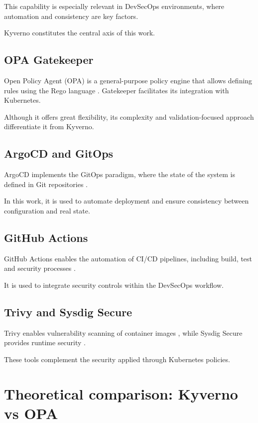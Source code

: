 This capability is especially relevant in DevSecOps environments, where automation and consistency are key factors.

Kyverno constitutes the central axis of this work.

\subsection{OPA Gatekeeper}

Open Policy Agent (OPA) is a general-purpose policy engine that allows defining rules using the Rego language \cite{opa_docs}. Gatekeeper facilitates its integration with Kubernetes.

Although it offers great flexibility, its complexity and validation-focused approach differentiate it from Kyverno.

\subsection{ArgoCD and GitOps}

ArgoCD implements the GitOps paradigm, where the state of the system is defined in Git repositories \cite{weaveworks_gitops}.

In this work, it is used to automate deployment and ensure consistency between configuration and real state.

\subsection{GitHub Actions}

GitHub Actions enables the automation of CI/CD pipelines, including build, test and security processes \cite{github_actions_docs}.

It is used to integrate security controls within the DevSecOps workflow.

\subsection{Trivy and Sysdig Secure}

Trivy enables vulnerability scanning of container images \cite{trivy_docs}, while Sysdig Secure provides runtime security \cite{sysdig_secure}.

These tools complement the security applied through Kubernetes policies.

\section{Theoretical comparison: Kyverno vs OPA}

